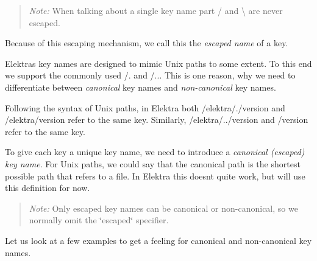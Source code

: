 \begin{quote}
{\itshape Note\+:} When talking about a single key name part {\ttfamily /} and {\ttfamily \textbackslash{}} are never escaped. \end{quote}


Because of this escaping mechanism, we call this the {\itshape escaped name} of a key.

Elektra\textquotesingle{}s key names are designed to mimic Unix paths to some extent. To this end we support the commonly used {\ttfamily /.} and {\ttfamily /..}. This is one reason, why we need to differentiate between {\itshape canonical} key names and {\itshape non-\/canonical} key names.

Following the syntax of Unix paths, in Elektra both {\ttfamily /elektra/./version} and {\ttfamily /elektra/version} refer to the same key. Similarly, {\ttfamily /elektra/../version} and {\ttfamily /version} refer to the same key.

To give each key a unique key name, we need to introduce a {\itshape canonical (escaped) key name}. For Unix paths, we could say that the canonical path is the shortest possible path that refers to a file. In Elektra this doesn\textquotesingle{}t quite work, but will use this definition for now.

\begin{quote}
{\itshape Note\+:} Only escaped key names can be canonical or non-\/canonical, so we normally omit the \char`\"{}escaped\char`\"{} specifier. \end{quote}


Let us look at a few examples to get a feeling for canonical and non-\/canonical key names.

